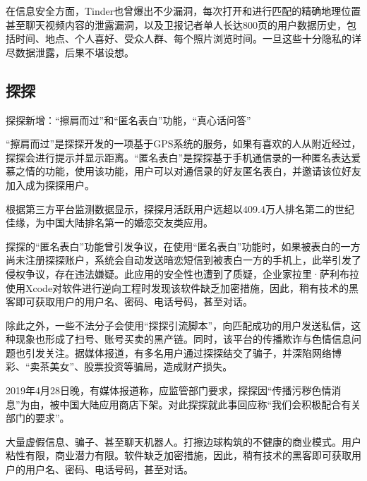 \documentclass[UTF8]{ctexart}
\begin{document}
\begin{tcolorbox}[breakable]
\begin{itemize}
    \end{itemize}
\end{tcolorbox}

在信息安全方面，Tinder也曾爆出不少漏洞，每次打开和进行匹配的精确地理位置甚至聊天视频内容的泄露漏洞，以及卫报记者单人长达800页的用户数据历史，包括时间、地点、个人喜好、受众人群、每个照片浏览时间。一旦这些十分隐私的详尽数据泄露，后果不堪设想。

\subsection{探探}

\begin{tcolorbox}
    探探新增：“擦肩而过”和“匿名表白”功能，“真心话问答”

    “擦肩而过”是探探开发的一项基于GPS系统的服务，如果有喜欢的人从附近经过，探探会进行提示并显示距离。“匿名表白”是探探基于手机通信录的一种匿名表达爱慕之情的功能，使用该功能，用户可以对通信录的好友匿名表白，并邀请该位好友加入成为探探用户。

    根据第三方平台监测数据显示，探探月活跃用户远超以409.4万人排名第二的世纪佳缘，为中国大陆排名第一的婚恋交友类应用。

    探探的“匿名表白”功能曾引发争议，在使用“匿名表白”功能时，如果被表白的一方尚未注册探探账户，系统会自动发送暗恋短信到被表白一方的手机上，此举引发了侵权争议，存在违法嫌疑。此应用的安全性也遭到了质疑，企业家拉里·萨利布拉使用Xcode对软件进行逆向工程时发现该软件缺乏加密措施，因此，稍有技术的黑客即可获取用户的用户名、密码、电话号码，甚至对话。

    除此之外，一些不法分子会使用“探探引流脚本”，向匹配成功的用户发送私信，这种现象也形成了扫号、账号买卖的黑产链。同时，该平台的传播欺诈与色情信息问题也引发关注。据媒体报道，有多名用户通过探探结交了骗子，并深陷网络博彩、“卖茶美女”、股票投资等骗局，造成财产损失。

    2019年4月28日晚，有媒体报道称，应监管部门要求，探探因“传播污秽色情消息”为由，被中国大陆应用商店下架。对此探探就此事回应称“我们会积极配合有关部门的要求”。\cite{WikiTantan}
\end{tcolorbox}

大量虚假信息、骗子、甚至聊天机器人。打擦边球构筑的不健康的商业模式。用户粘性有限，商业潜力有限。软件缺乏加密措施，因此，稍有技术的黑客即可获取用户的用户名、密码、电话号码，甚至对话。
\end{document}
